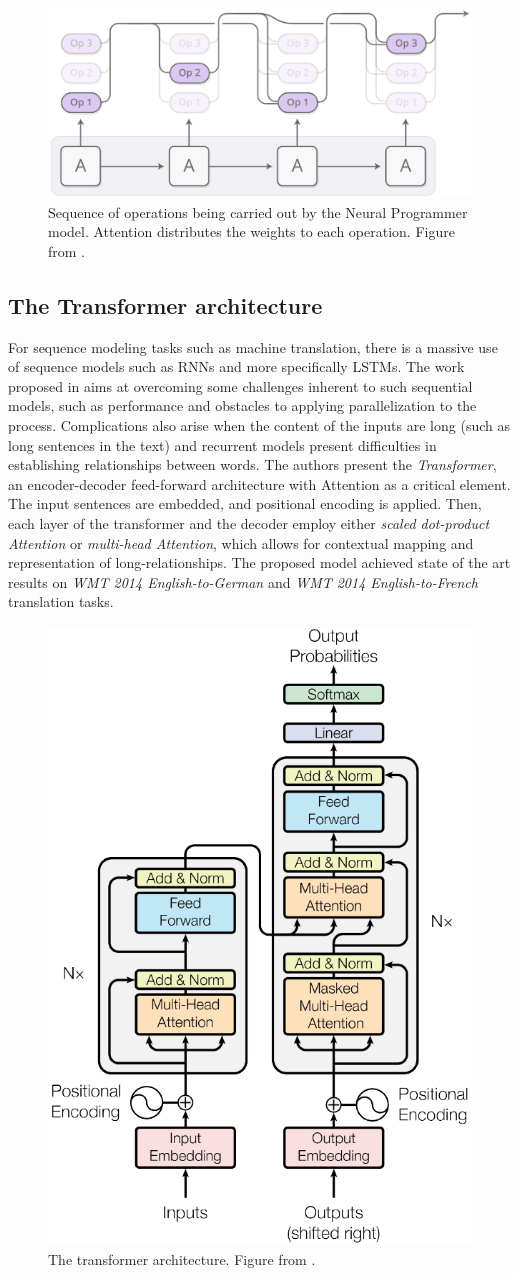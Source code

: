 \documentclass[12pt]{article}
\begin{document}
\begin{figure}
\begin{center}
    \includegraphics[width=0.5\linewidth]{./img/neural-programmer.png}
\caption{
    Sequence of operations being carried out by the Neural Programmer model.
    Attention distributes the weights to each operation.
    Figure from \cite{ref:distill}.
}
\label{fig:np}
\end{center}
\end{figure}

\subsection{The Transformer architecture}
For sequence modeling tasks such
as machine translation, there is a massive use of sequence models such as RNNs and more specifically LSTMs.
The work proposed in \cite{ref:transformer} aims at overcoming some challenges inherent to such sequential
models, such as performance and obstacles to applying parallelization to the process.
Complications also arise when the content of the inputs are long (such as long sentences in the text) and
recurrent models present difficulties in establishing relationships between words.
The authors present the \emph{Transformer}, an encoder-decoder feed-forward architecture with Attention as a critical element.
The input sentences are embedded, and positional encoding is applied.
Then, each layer of the transformer and the decoder employ either \emph{scaled dot-product Attention} or
\emph{multi-head Attention}, which allows for contextual mapping and representation of long-relationships.
The proposed model achieved state of the art results on \emph{WMT 2014 English-to-German} and
\emph{WMT 2014 English-to-French} translation tasks.

\begin{figure}
\begin{center}
    \includegraphics[width=0.4\linewidth]{./img/transformer.png}
\caption{
    The transformer architecture.
    Figure from \cite{ref:transformer}.
}
\label{fig:transformer}
\end{center}
\end{figure}
\end{document}
